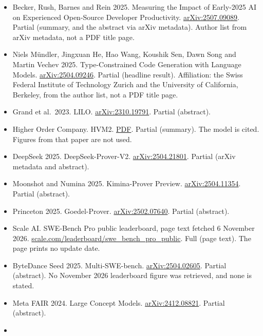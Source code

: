 \documentclass[10pt,letterpaper]{article}
\newcounter{none}
\begin{document}
\begin{itemize}
  Solved Correctly?
  \href{https://arxiv.org/abs/2503.15223}{arXiv:2503.15223}. ICSE
  (International Conference on Software Engineering) 2026. Partial
  (findings summary).
\item
  Becker, Rush, Barnes and Rein 2025. Measuring the Impact of Early-2025
  AI on Experienced Open-Source Developer Productivity.
  \href{https://arxiv.org/abs/2507.09089}{arXiv:2507.09089}. Partial
  (summary, and the abstract via arXiv metadata). Author list from arXiv
  metadata, not a PDF title page.
\item
  Niels Mündler, Jingxuan He, Hao Wang, Koushik Sen, Dawn Song and
  Martin Vechev 2025. Type-Constrained Code Generation with Language
  Models. \href{https://arxiv.org/abs/2504.09246}{arXiv:2504.09246}.
  Partial (headline result). Affiliation: the Swiss Federal Institute of
  Technology Zurich and the University of California, Berkeley, from the
  author list, not a PDF title page.
\item
  Grand et al.~2023. LILO.
  \href{https://arxiv.org/abs/2310.19791}{arXiv:2310.19791}. Partial
  (abstract).
\item
  Higher Order Company. HVM2.
  \href{https://raw.githubusercontent.com/HigherOrderCO/HVM/main/paper/HVM2.pdf}{PDF}.
  Partial (summary). The model is cited. Figures from that paper are not
  used.
\item
  DeepSeek 2025. DeepSeek-Prover-V2.
  \href{https://arxiv.org/abs/2504.21801}{arXiv:2504.21801}. Partial
  (arXiv metadata and abstract).
\item
  Moonshot and Numina 2025. Kimina-Prover Preview.
  \href{https://arxiv.org/abs/2504.11354}{arXiv:2504.11354}. Partial
  (abstract).
\item
  Princeton 2025. Goedel-Prover.
  \href{https://arxiv.org/abs/2502.07640}{arXiv:2502.07640}. Partial
  (abstract).
\item
  Scale AI. SWE-Bench Pro public leaderboard, page text fetched 6
  November 2026.
  \href{https://scale.com/leaderboard/swe_bench_pro_public}{scale.com/leaderboard/swe\_bench\_pro\_public}.
  Full (page text). The page prints no update date.
\item
  ByteDance Seed 2025. Multi-SWE-bench.
  \href{https://arxiv.org/abs/2504.02605}{arXiv:2504.02605}. Partial
  (abstract). No November 2026 leaderboard figure was retrieved, and
  none is stated.
\item
  Meta FAIR 2024. Large Concept Models.
  \href{https://arxiv.org/abs/2412.08821}{arXiv:2412.08821}. Partial
  (abstract).
\item

\end{itemize}
\end{document}
